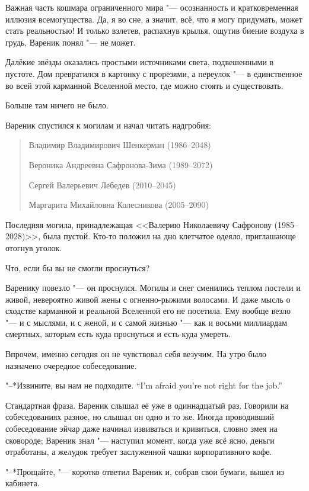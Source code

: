 Важная часть кошмара ограниченного мира "--- осознанность и кратковременная иллюзия всемогущества.
Да, я во сне, а значит, всё, что я могу придумать, может стать реальностью!
И только взлетев, распахнув крылья, ощутив биение воздуха в грудь, Вареник понял "--- не может.

Далёкие звёзды оказались простыми источниками света, подвешенными в пустоте.
Дом превратился в картонку с прорезями, а переулок "--- в единственное во всей этой карманной Вселенной место, где можно стоять и существовать.

Больше там ничего не было.

Вареник спустился к могилам и начал читать надгробия:

\begin{quote}
Владимир Владимирович Шенкерман (1986--2048)

Вероника Андреевна Сафронова-Зима (1989--2072)

Сергей Валерьевич Лебедев (2010--2045)

Маргарита Михайловна Колесникова (2005--2090)
\end{quote}

Последняя могила, принадлежащая <<Валерию Николаевичу Сафронову (1985--2028)>>, была пустой.
Кто-то положил на дно клетчатое одеяло, приглашающе отогнув уголок.

Что, если бы вы не смогли проснуться?

Варенику повезло "--- он проснулся.
Могилы и снег сменились теплом постели и живой, невероятно живой жены с огненно-рыжими волосами.
И даже мысль о сходстве карманной и реальной Вселенной его не посетила.
Ему вообще везло "--- и с мыслями, и с женой, и с самой жизнью "--- как и восьми миллиардам смертных, которым есть куда проснуться и есть куда умереть.

Впрочем, именно сегодня он не чувствовал себя везучим.
На утро было назначено очередное собеседование.

\asterism

{"--*Извините, вы нам не подходите.}
{``I'm afraid you're not right for the job.''}

Стандартная фраза.
Вареник слышал её уже в одиннадцатый раз.
Говорили на собеседованиях разное, но слышал он одно и то же.
Иногда проводивший собеседование эйчар даже начинал извиваться и кривиться, словно змея на сковороде;
Вареник знал "--- наступил момент, когда уже всё ясно, деньги отработаны, а желудок требует заслуженной чашки корпоративного кофе.

"--*Прощайте, "--- коротко ответил Вареник и, собрав свои бумаги, вышел из кабинета.

